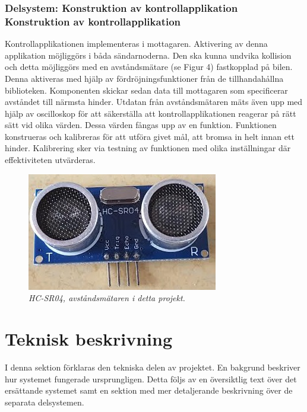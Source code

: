\documentclass[a4paper]{article}
\begin{document}
\subsubsection{Delsystem: Konstruktion av kontrollapplikation \\ Konstruktion av kontrollapplikation}
Kontrollapplikationen implementeras i mottagaren. Aktivering av denna applikation möjliggörs i båda sändarnoderna. Den ska kunna undvika kollision och detta möjliggörs med en avståndsmätare (se Figur 4) fastkopplad på bilen. Denna aktiveras med hjälp av fördröjningsfunktioner från de tillhandahållna biblioteken. Komponenten skickar sedan data till mottagaren som specificerar avståndet till närmsta hinder. Utdatan från avståndsmätaren mäts även upp med hjälp av oscilloskop för att säkerställa att kontrollapplikationen reagerar på rätt sätt vid olika värden. Dessa värden fångas upp av en funktion. Funktionen konstrueras och kalibreras för att utföra givet mål, att bromsa in helt innan ett hinder. Kalibrering sker via testning av funktionen med olika inställningar där effektiviteten utvärderas. 


\begin{figure}[H]
\includegraphics[scale=0.6]{DistanceMeasurementFront.jpg}
\centering
\caption{\it HC-SR04, avståndsmätaren i detta projekt.}
\end{figure} 



\newpage
\section{Teknisk beskrivning}
I denna sektion förklaras den tekniska delen av projektet. En bakgrund beskriver hur systemet fungerade ursprungligen. Detta följs av en översiktlig text över det ersättande systemet samt en sektion med mer detaljerande beskrivning över de separata delsystemen.
\end{document}
